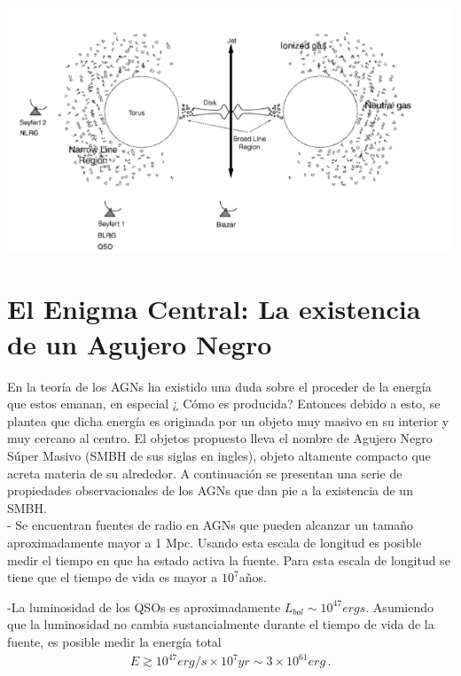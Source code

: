 \includegraphics[scale=.5]{./figures/3_AGNs/Clasificacion_AGN}
\label{fig:Tipos_AGNs_por_observador}



\section{El Enigma Central: La existencia de un Agujero Negro}
\label{sec:Zoo_AGN's}

En la teoría de los AGNs ha existido una duda sobre el proceder de la energía que estos emanan, en especial ¿ Cómo es producida? Entonces debido a esto, se plantea que dicha energía es originada por un objeto muy masivo en su interior y muy cercano al centro. El objetos propuesto lleva el nombre de Agujero Negro Súper Masivo (SMBH de sus siglas en ingles), objeto altamente compacto que acreta materia de su alrededor. A continuación se presentan una serie de propiedades observacionales de los AGNs que dan pie a la existencia de un SMBH. \\

- Se encuentran fuentes de radio en AGNs que pueden alcanzar un tamaño aproximadamente mayor a 1 Mpc. Usando esta escala de longitud es posible medir el tiempo en que ha estado activa la fuente. Para esta escala de longitud se tiene que el tiempo de vida es mayor a $10^{7}$años.

-La luminosidad de los QSOs es aproximadamente $L_{bol}\sim 10^{47}ergs$. Asumiendo que la luminosidad no cambia sustancialmente durante el tiempo de vida de la fuente, es posible medir la energía total
\begin{align}
E \gtrsim 10^{47} erg/s \times 10^{7}yr \sim 3\times 10^{61}erg\,.
\end{align}


